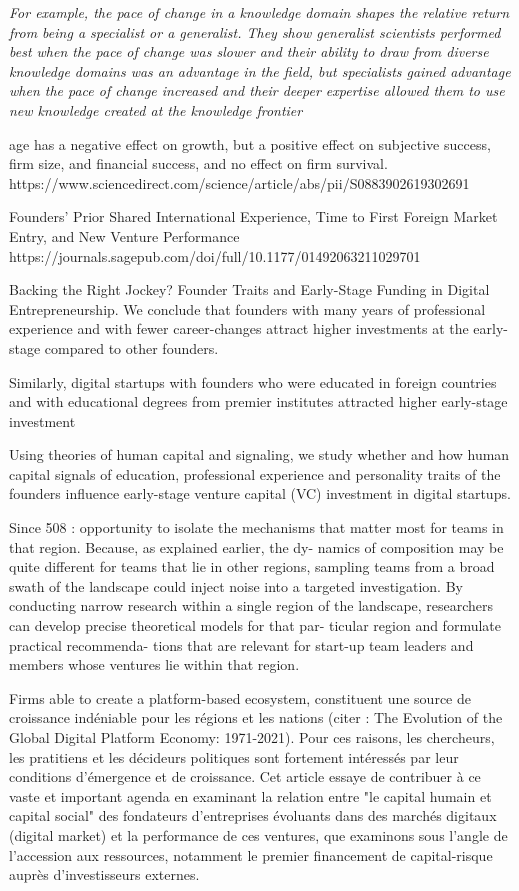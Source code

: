 \documentclass[11pt]{article}
\begin{document}
\textit{For example, \citep{teodoridis2019creativity} the pace of change in a knowledge domain shapes the relative return from being a specialist or a generalist. They show generalist scientists performed best when the pace of change was slower and their ability to draw from diverse knowledge domains was an advantage in the field, but specialists gained advantage when the pace of change increased and their deeper expertise allowed them to use new knowledge created at the knowledge frontier}


age has a negative effect on growth, but a positive effect on subjective success, firm size, and financial success, and no effect on firm survival. https://www.sciencedirect.com/science/article/abs/pii/S0883902619302691

Founders’ Prior Shared International Experience, Time to First Foreign Market Entry, and New Venture Performance
https://journals.sagepub.com/doi/full/10.1177/01492063211029701



Backing the Right Jockey? Founder Traits and Early-Stage Funding in Digital Entrepreneurship.
We conclude that founders with many years of professional experience and with fewer career-changes attract higher investments at the early-stage compared to other founders.

Similarly, digital startups with founders who were educated in foreign countries and with educational degrees from premier institutes attracted higher early-stage investment


Using theories of human capital and signaling, we study whether and how human capital signals of education, professional experience and personality traits of the founders influence early-stage venture capital (VC) investment in digital startups.


Since 508 : opportunity to isolate the mechanisms that matter most for teams in that region. Because, as explained earlier, the dy- namics of composition may be quite different for teams that lie in other regions, sampling teams from a broad swath of the landscape could inject noise into a targeted investigation. By conducting narrow research within a single region of the landscape, researchers can develop precise theoretical models for that par- ticular region and formulate practical recommenda- tions that are relevant for start-up team leaders and members whose ventures lie within that region.

Firms able to create a platform-based ecosystem, constituent une source de croissance indéniable pour les régions et les nations (citer : The Evolution of the Global Digital Platform Economy: 1971-2021). Pour ces raisons, les chercheurs, les pratitiens et les décideurs politiques sont fortement intéressés par leur conditions d'émergence et de croissance. Cet article essaye de contribuer à ce vaste et important agenda en examinant la relation entre "le capital humain et capital social" des fondateurs d'entreprises évoluants dans des marchés digitaux (digital market) et la performance de ces ventures, que examinons sous l'angle de l'accession aux ressources, notamment le premier financement de capital-risque auprès d'investisseurs externes.
\end{document}
